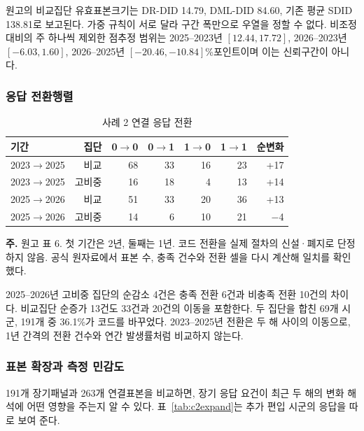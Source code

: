 \documentclass[11pt,a4paper]{article}
\begin{document}
원고의 비교집단 유효표본크기는 DR-DID 14.79, DML-DID 84.60, 기존 평균 SDID 138.81로 보고된다. 가중 규칙이 서로 달라 구간 폭만으로 우열을 정할 수 없다. 비조정 대비의 주 하나씩 제외한 점추정 범위는 2025--2023년 $[12.44,17.72]$, 2026--2023년 $[-6.03,1.60]$, 2026--2025년 $[-20.46,-10.84]$\%포인트이며 이는 신뢰구간이 아니다.

\subsubsection{응답 전환행렬}
\begin{table}[htbp]\centering\small
\caption{사례 2 연결 응답 전환}\label{tab:c2transitions}
\begin{tabular}{lrrrrrr}
\toprule
기간 & 집단 & 0$\to$0 & 0$\to$1 & 1$\to$0 & 1$\to$1 & 순변화 \\
\midrule
2023$\to$2025 & 비교 & 68 & 33 & 16 & 23 & +17 \\
2023$\to$2025 & 고비중 & 16 & 18 & 4 & 13 & +14 \\
2025$\to$2026 & 비교 & 51 & 33 & 20 & 36 & +13 \\
2025$\to$2026 & 고비중 & 14 & 6 & 10 & 21 & $-$4 \\
\bottomrule\end{tabular}
\par\vspace{3pt}\begin{minipage}{.98\linewidth}\footnotesize \raggedright\textbf{주.} 원고 표 6. 첫 기간은 2년, 둘째는 1년. 코드 전환을 실제 절차의 신설·폐지로 단정하지 않음. 공식 원자료에서 표본 수, 충족 건수와 전환 셀을 다시 계산해 일치를 확인했다.\end{minipage}
\end{table}
2025--2026년 고비중 집단의 순감소 4건은 충족 전환 6건과 비충족 전환 10건의 차이다. 비교집단 순증가 13건도 33건과 20건의 이동을 포함한다. 두 집단을 합친 69개 시군, 191개 중 36.1\%가 코드를 바꾸었다. 2023--2025년 전환은 두 해 사이의 이동으로, 1년 간격의 전환 건수와 연간 발생률처럼 비교하지 않는다.

\subsubsection{표본 확장과 측정 민감도}
191개 장기패널과 263개 연결표본을 비교하면, 장기 응답 요건이 최근 두 해의 변화 해석에 어떤 영향을 주는지 알 수 있다. 표~\ref{tab:c2expand}는 추가 편입 시군의 응답을 따로 보여 준다.
\end{document}
